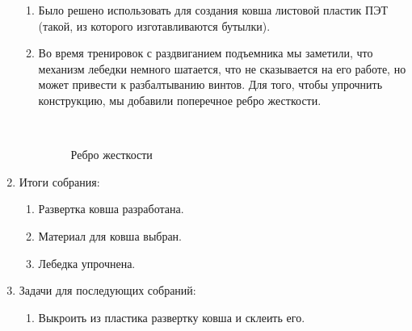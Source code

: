 \begin{enumerate}
\begin{enumerate}
	  \item Было решено использовать для создания ковша листовой пластик ПЭТ (такой, из которого изготавливаются бутылки).
	  
	  \item Во время тренировок с раздвиганием подъемника мы заметили, что механизм лебедки немного шатается, что не сказывается на его работе, но может привести к разбалтыванию винтов. Для того, чтобы упрочнить конструкцию, мы добавили поперечное ребро жесткости.
	  
	  \begin{figure}[H]
	  	\begin{minipage}[h]{0.2\linewidth}
	  		\center  
	  	\end{minipage}
	  	\begin{minipage}[h]{0.6\linewidth}
	  		\caption{Ребро жесткости}
	  	\end{minipage}
	  \end{figure}
	  
    \end{enumerate}
    
	\item Итоги собрания: 
	\begin{enumerate}
	  \item Развертка ковша разработана.
	  
	  \item Материал для ковша выбран.
	  
	  \item Лебедка упрочнена.
	  
    \end{enumerate}
    
	\item Задачи для последующих собраний:
	\begin{enumerate}
	  \item Выкроить из пластика развертку ковша и склеить его.
	  
    \end{enumerate}     
\end{enumerate}
\fillpage